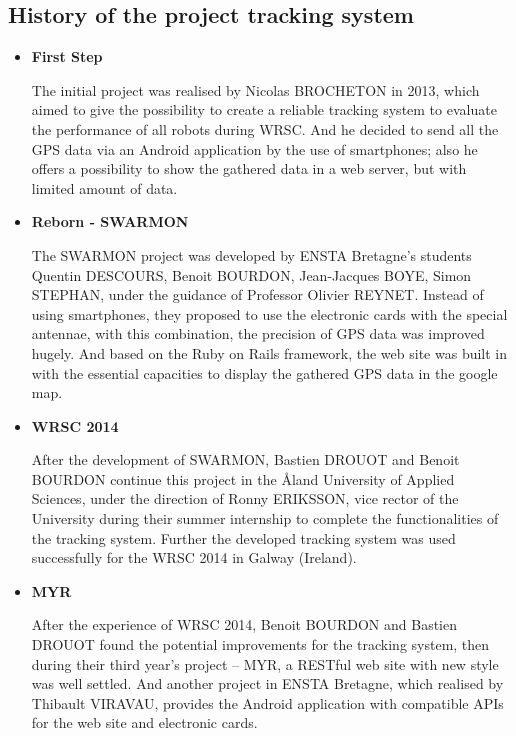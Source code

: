 \subsection{History of the project tracking system}
\begin{itemize}
\item{\textbf{First Step}}

The initial project was realised by Nicolas BROCHETON in 2013, which aimed to give the possibility to create a reliable tracking system to evaluate the performance of all robots during WRSC. And he decided to send all the GPS data via an Android application by the use of smartphones; also he offers a possibility to show the gathered data in a web server, but with limited amount of data.

\item{\textbf{Reborn - SWARMON}}

The SWARMON project was developed by ENSTA Bretagne's students Quentin DESCOURS, Benoit BOURDON, Jean-Jacques BOYE, Simon STEPHAN, under the guidance of Professor Olivier REYNET. Instead of using smartphones, they proposed to use the electronic cards with the special antennae, with this combination, the precision of GPS data was improved hugely. And based on the Ruby on Rails framework, the web site was built in with the essential capacities to display the gathered GPS data in the google map.

\item{\textbf{WRSC 2014}}

After the development of SWARMON,   Bastien DROUOT and Benoit BOURDON continue this project in the Åland University of Applied Sciences, under the direction of Ronny ERIKSSON, vice rector of the University during their summer internship to complete the functionalities of the tracking system. Further the developed tracking system was used successfully for the WRSC 2014 in Galway (Ireland). 

\item{\textbf{MYR}}

After the experience of WRSC 2014, Benoit BOURDON and Bastien DROUOT found the potential improvements for the tracking system, then during their third year’s project – MYR, a RESTful web site with new style was well settled. And another project in ENSTA Bretagne, which realised by Thibault VIRAVAU, provides the Android application with compatible APIs for the web site and electronic cards.
\end{itemize}